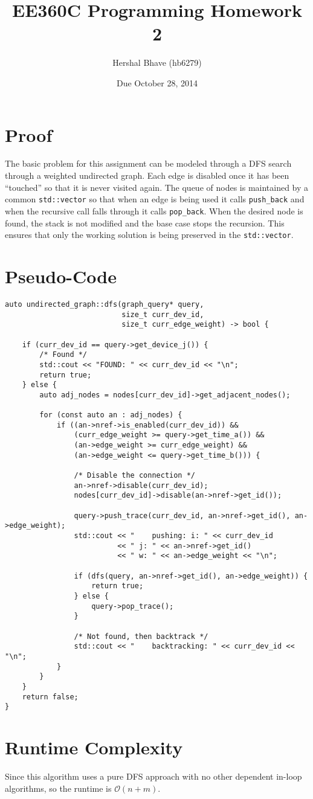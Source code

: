 \documentclass{article}
\title{EE360C Programming Homework 2}
\author{Hershal Bhave (hb6279)}
\date{Due October 28, 2014}
\begin{document}
\maketitle

\section{Proof}
The basic problem for this assignment can be modeled through a DFS
search through a weighted undirected graph. Each edge is disabled once
it has been ``touched'' so that it is never visited again. The queue
of nodes is maintained by a common \verb|std::vector| so that when an
edge is being used it calls \verb|push_back| and when the recursive
call falls through it calls \verb|pop_back|. When the desired node is
found, the stack is not modified and the base case stops the
recursion. This ensures that only the working solution is being
preserved in the \verb|std::vector|.

\section{Pseudo-Code}
{  \footnotesize
\begin{verbatim}
auto undirected_graph::dfs(graph_query* query,
                           size_t curr_dev_id,
                           size_t curr_edge_weight) -> bool {

    if (curr_dev_id == query->get_device_j()) {
        /* Found */
        std::cout << "FOUND: " << curr_dev_id << "\n";
        return true;
    } else {
        auto adj_nodes = nodes[curr_dev_id]->get_adjacent_nodes();

        for (const auto an : adj_nodes) {
            if ((an->nref->is_enabled(curr_dev_id)) &&
                (curr_edge_weight >= query->get_time_a()) &&
                (an->edge_weight >= curr_edge_weight) &&
                (an->edge_weight <= query->get_time_b())) {

                /* Disable the connection */
                an->nref->disable(curr_dev_id);
                nodes[curr_dev_id]->disable(an->nref->get_id());

                query->push_trace(curr_dev_id, an->nref->get_id(), an->edge_weight);
                std::cout << "    pushing: i: " << curr_dev_id
                          << " j: " << an->nref->get_id()
                          << " w: " << an->edge_weight << "\n";

                if (dfs(query, an->nref->get_id(), an->edge_weight)) {
                    return true;
                } else {
                    query->pop_trace();
                }

                /* Not found, then backtrack */
                std::cout << "    backtracking: " << curr_dev_id << "\n";
            }
        }
    }
    return false;
}
\end{verbatim}
}

\section{Runtime Complexity}
Since this algorithm uses a pure DFS approach with no other dependent
in-loop algorithms, so the runtime is $\mathcal{O}(n+m)$.
\end{document}
